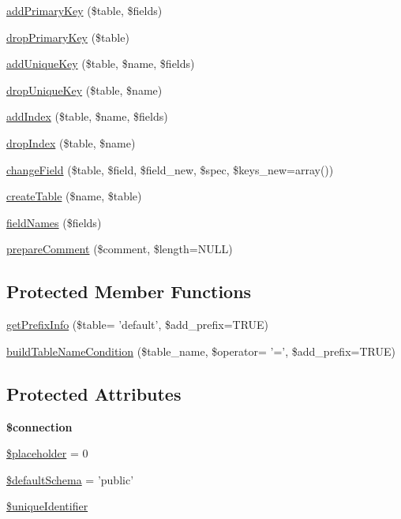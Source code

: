 \begin{DoxyCompactItemize}
\item 
\hyperlink{classDatabaseSchema_abe9490392e8408eb3847256aeb15bba0}{addPrimaryKey} (\$table, \$fields)
\item 
\hyperlink{classDatabaseSchema_a08057609758a32c13c4d1863da54b63e}{dropPrimaryKey} (\$table)
\item 
\hyperlink{classDatabaseSchema_ac2e6358da1c2d38fe6a1a1d003dac8ca}{addUniqueKey} (\$table, \$name, \$fields)
\item 
\hyperlink{classDatabaseSchema_a40519a35f27d1bfe0f2eb0e759df1afd}{dropUniqueKey} (\$table, \$name)
\item 
\hyperlink{classDatabaseSchema_a12f4b519abe55aaef3e4d736dbb27ab7}{addIndex} (\$table, \$name, \$fields)
\item 
\hyperlink{classDatabaseSchema_adf5467aa59e462857527d8f1a5988a81}{dropIndex} (\$table, \$name)
\item 
\hyperlink{classDatabaseSchema_ab2470d34145fdbb413dd952baf7067be}{changeField} (\$table, \$field, \$field\_\-new, \$spec, \$keys\_\-new=array())
\item 
\hyperlink{classDatabaseSchema_a0117d8198d2da93013fe5bf823649fd6}{createTable} (\$name, \$table)
\item 
\hyperlink{classDatabaseSchema_a7255734df8d5b7a1475f8cd0d8320e06}{fieldNames} (\$fields)
\item 
\hyperlink{classDatabaseSchema_a45f043158682052792524ab48a188dc5}{prepareComment} (\$comment, \$length=NULL)
\end{DoxyCompactItemize}
\subsection*{Protected Member Functions}
\begin{DoxyCompactItemize}
\item 
\hyperlink{classDatabaseSchema_a8acae6a4bd3e5ba89aaddc8133927ee2}{getPrefixInfo} (\$table= 'default', \$add\_\-prefix=TRUE)
\item 
\hyperlink{classDatabaseSchema_a4a2510c6b95598b613355d1a9b9a706f}{buildTableNameCondition} (\$table\_\-name, \$operator= '=', \$add\_\-prefix=TRUE)
\end{DoxyCompactItemize}
\subsection*{Protected Attributes}
\begin{DoxyCompactItemize}
\item 
\hypertarget{classDatabaseSchema_acd465dd5d817360083d0ff87971f692b}{
{\bfseries \$connection}}
\label{classDatabaseSchema_acd465dd5d817360083d0ff87971f692b}

\item 
\hyperlink{classDatabaseSchema_a113f21a5dcec8719b09a09d422a9dfc9}{\$placeholder} = 0
\item 
\hyperlink{classDatabaseSchema_ad1b406aa6605327a3f5c910e0fd37816}{\$defaultSchema} = 'public'
\item 
\hyperlink{classDatabaseSchema_ab8e3b674c237c9f4590c38d6ebf8a3d1}{\$uniqueIdentifier}
\end{DoxyCompactItemize}


